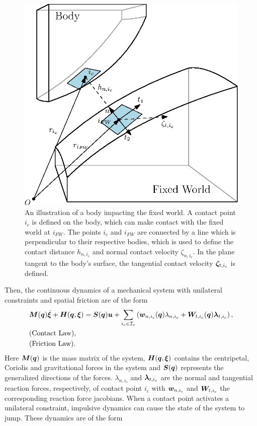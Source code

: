 \documentclass[../DC2017114Bouma.tex]{subfiles}
\begin{document}
\begin{figure}[h]
\centering
\includegraphics[width=.75\textwidth]{contactplanes.eps}\caption{An illustration of a body impacting the fixed world. A contact point $i_c$ is defined on the body, which can make contact with the fixed world at $i_{FW}$. The points $i_c$ and $i_{FW}$ are connected by a line which is perpendicular to their respective bodies, which is used to define the contact distance $h_{n,i_c}$ and normal contact velocity $\zeta_{n,i_c}$. In the plane tangent to the body's surface, the tangential contact velocity $\boldsymbol{\zeta}_{t,i_c}$ is defined.} \label{fig:contactplanes}
\end{figure}

Then, the continuous dynamics of a mechanical system with unilateral constraints and spatial friction are of the form
\begin{align}
&{\boldsymbol{M}}({\boldsymbol{q}})\dot{\boldsymbol{\xi}} + {\boldsymbol{H}}({\boldsymbol{q}},\boldsymbol{\xi}) = {\boldsymbol{S}}({\boldsymbol{q}}){\boldsymbol{u}} + \sum_{i_c\in\mathcal{I}_c}\left({\boldsymbol{w}}_{n,i_c}({\boldsymbol{q}})\lambda_{n,i_c} + {\boldsymbol{W}}_{t,i_c}({\boldsymbol{q}})\boldsymbol{\lambda}_{t,i_c} \right), \label{eq:appcont1}\\
&\text{(Contact Law)},\label{eq:appcont2}\\
&\text{(Friction Law)}.\label{eq:appcont3}
\end{align}
Here ${\boldsymbol{M}}({\boldsymbol{q}})$ is the mass matrix of the system, ${\boldsymbol{H}}({\boldsymbol{q}},\boldsymbol{\xi})$ contains the centripetal, Coriolis and gravitational forces in the system and ${\boldsymbol{S}}({\boldsymbol{q}})$ represents the generalized directions of the forces. $\lambda_{n,i_c}$ and $\boldsymbol{\lambda}_{t,i_c}$ are the normal and tangential reaction forces, respectively, of contact point $i_c$ with ${\boldsymbol{w}}_{n,i_c}$ and ${\boldsymbol{W}}_{t,i_c}$ the corresponding reaction force jacobians. When a contact point activates a unilateral constraint, impulsive dynamics can cause the state of the system to jump. These dynamics are of the form
\end{document}
